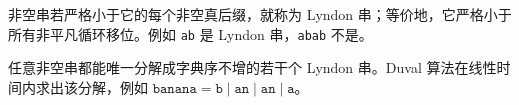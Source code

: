 非空串若严格小于它的每个非空真后缀，就称为 Lyndon 串；等价地，它严格小于所有非平凡循环移位。例如 \texttt{ab} 是 Lyndon 串，\texttt{abab} 不是。

任意非空串都能唯一分解成字典序不增的若干个 Lyndon 串。Duval 算法在线性时间内求出该分解，例如 $\texttt{banana}=\texttt{b}\mid\texttt{an}\mid\texttt{an}\mid\texttt{a}$。
